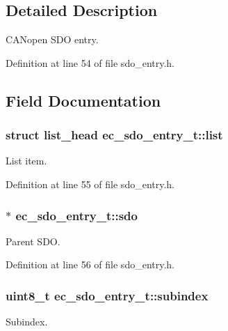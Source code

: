\subsection{Detailed Description}
C\-A\-Nopen S\-D\-O entry. 

Definition at line 54 of file sdo\-\_\-entry.\-h.



\subsection{Field Documentation}
\subsubsection[{list}]{\setlength{\rightskip}{0pt plus 5cm}struct list\-\_\-head ec\-\_\-sdo\-\_\-entry\-\_\-t\-::list}\label{structec__sdo__entry__t_a7ac0567e0a3b260803d3de36ddbc7a63}


List item. 



Definition at line 55 of file sdo\-\_\-entry.\-h.

\subsubsection[{sdo}]{$\ast$ ec\-\_\-sdo\-\_\-entry\-\_\-t\-::sdo}\label{structec__sdo__entry__t_a191cd495d9a5b0b13af072f704b88733}


Parent S\-D\-O. 



Definition at line 56 of file sdo\-\_\-entry.\-h.

\subsubsection[{subindex}]{\setlength{\rightskip}{0pt plus 5cm}uint8\-\_\-t ec\-\_\-sdo\-\_\-entry\-\_\-t\-::subindex}\label{structec__sdo__entry__t_a7411aa63d3e57ac816ecfbabdc9926c8}


Subindex. 



